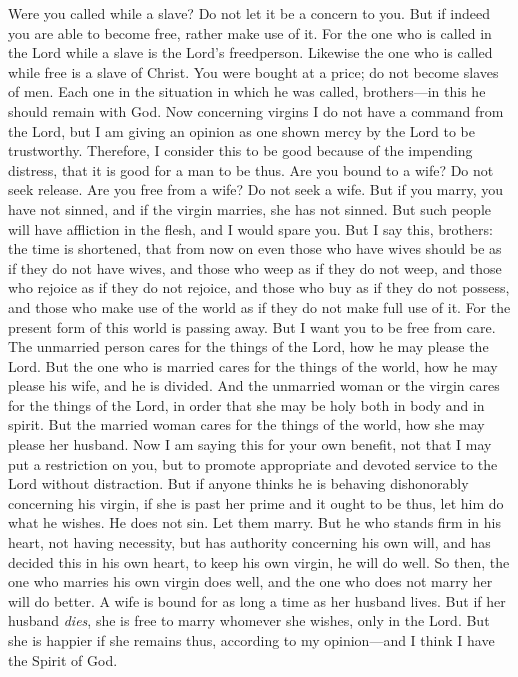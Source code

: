 \begin{biblechapter}
\verse Were you called while a slave? Do not let it be a concern to you. But if indeed you are able to become free, rather make use of it.
\verse For the one who is called in the Lord while a slave is the Lord’s freedperson. Likewise the one who is called while free is a slave of Christ.
\verse You were bought at a price; do not become slaves of men.
\verse Each one in the situation in which he was called, brothers—in this he should remain with God.
 Now concerning virgins I do not have a command from the Lord, but I am giving an opinion as one shown mercy by the Lord to be trustworthy.
\verse Therefore, I consider this to be good because of the impending distress, that it is good for a man to be thus.
\verse Are you bound to a wife? Do not seek release. Are you free from a wife? Do not seek a wife.
\verse But if you marry, you have not sinned, and if the virgin marries, she has not sinned. But such people will have affliction in the flesh, and I would spare you.
\verse But I say this, brothers: the time is shortened, that from now on even those who have wives should be as if they do not have wives,
\verse and those who weep as if they do not weep, and those who rejoice as if they do not rejoice, and those who buy as if they do not possess,
\verse and those who make use of the world as if they do not make full use of it. For the present form of this world is passing away.
\verse But I want you to be free from care. The unmarried person cares for the things of the Lord, how he may please the Lord.
\verse But the one who is married cares for the things of the world, how he may please his wife,
\verse and he is divided. And the unmarried woman or the virgin cares for the things of the Lord, in order that she may be holy both in body and in spirit. But the married woman cares for the things of the world, how she may please her husband.
\verse Now I am saying this for your own benefit, not that I may put a restriction on you, but to promote appropriate and devoted service to the Lord without distraction.
\verse But if anyone thinks he is behaving dishonorably concerning his virgin, if she is past her prime and it ought to be thus, let him do what he wishes. He does not sin. Let them marry.
\verse But he who stands firm in his heart, not having necessity, but has authority concerning his own will, and has decided this in his own heart, to keep his own virgin, he will do well.
\verse So then, the one who marries his own virgin does well, and the one who does not marry her will do better.
\verse A wife is bound for as long a time as her husband lives. But if her husband \textit{dies}, she is free to marry whomever she wishes, only in the Lord.
\verse But she is happier if she remains thus, according to my opinion—and I think I have the Spirit of God.
\end{biblechapter}


